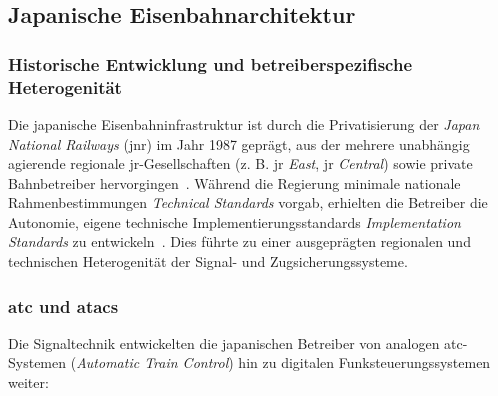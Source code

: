 \documentclass[runningheads]{res/llncs}
\begin{document}
\subsection{Japanische Eisenbahnarchitektur}
\label{sec:Japanische_Eisenbahnarchitektur}

\subsubsection{Historische Entwicklung und betreiberspezifische Heterogenität}
\label{sec:Historische_Entwicklung_und_betreiberspezifische_Heterogenität}
Die japanische Eisenbahninfrastruktur ist durch die Privatisierung der \textit{Japan National Railways} (\gls{jnr}) im Jahr 1987 geprägt, aus der mehrere unabhängig agierende regionale \gls{jr}-Gesellschaften (z. B. \gls{jr} \textit{East}, \gls{jr} \textit{Central}) sowie private Bahnbetreiber hervorgingen~\parencite[S. 47]{yanaseJapanese2011}. Während die Regierung minimale nationale Rahmenbestimmungen \textit{Technical Standards} vorgab, erhielten die Betreiber die Autonomie, eigene technische Implementierungsstandards \textit{Implementation Standards} zu entwickeln~\parencite[S. 48--49, 51]{yanaseJapanese2011}. Dies führte zu einer ausgeprägten regionalen und technischen Heterogenität der Signal- und Zugsicherungssysteme.


\subsubsection{\texorpdfstring{\gls{atc} und \gls{atacs}}{ATC und ATACS}}
\label{sec:ATC_und_ATACS}
Die Signaltechnik entwickelten die japanischen Betreiber von analogen \gls{atc}-Systemen (\textit{Automatic Train Control}) hin zu digitalen Funksteuerungssystemen weiter:
\end{document}
